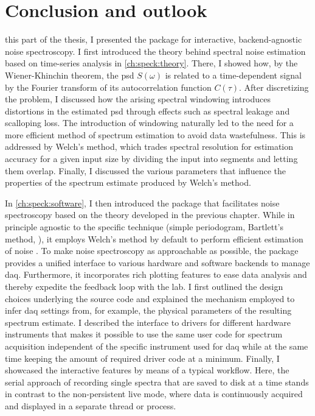 \chapter{Conclusion and outlook}\label{ch:speck:conclusion}
 this part of the thesis, I presented the \pyspeck \python package for interactive, backend-agnostic noise spectroscopy.
I first introduced the theory behind spectral noise estimation based on time-series analysis in \cref{ch:speck:theory}.
There, I showed how, by the Wiener-Khinchin theorem, the \gls{psd} $S(\omega)$ is related to a time-dependent signal by the Fourier transform of its autocorrelation function $C(\tau)$.
After discretizing the problem, I discussed how the arising spectral windowing introduces distortions in the estimated \gls{psd} through effects such as spectral leakage and scalloping loss.
The introduction of windowing naturally led to the need for a more efficient method of spectrum estimation to avoid data wastefulness.
This is addressed by Welch's method, which trades spectral resolution for estimation accuracy for a given input size by dividing the input into segments and letting them overlap.
Finally, I discussed the various parameters that influence the properties of the spectrum estimate produced by Welch's method.

In \cref{ch:speck:software}, I then introduced the \pyspeck package that facilitates noise spectroscopy based on the theory developed in the previous chapter.
While in principle agnostic to the specific technique (simple periodogram, Bartlett's method, \etc), it employs Welch's method by default to perform efficient estimation of noise .
To make noise spectroscopy as approachable as possible, the package provides a unified interface to various hardware and software backends to manage \acrlong{daq}.
Furthermore, it incorporates rich plotting features to ease data analysis and thereby expedite the feedback loop with the lab.
I first outlined the design choices underlying the source code and explained the mechanism employed to infer \gls{daq} settings from, for example, the physical parameters of the resulting spectrum estimate.
I described the interface to drivers for different hardware instruments that makes it possible to use the same user code for spectrum acquisition independent of the specific instrument used for \acrlong{daq} while at the same time keeping the amount of required driver code at a minimum.
Finally, I showcased the interactive features by means of a typical workflow.
Here, the serial approach of recording single spectra that are saved to disk at a time stands in contrast to the non-persistent live mode, where data is continuously acquired and displayed in a separate thread or process.


